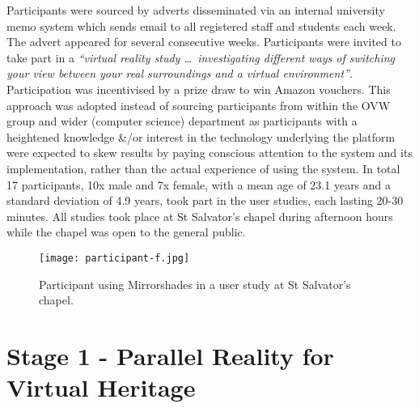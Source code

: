 Participants were sourced by adverts disseminated via an internal university memo system which sends email to all registered staff and students each week. The advert appeared for several consecutive weeks. Participants were invited to take part in a \textit{``virtual reality study \ldots\ investigating different ways of switching your view between your real surroundings and a virtual environment''}. Participation was incentivised by a prize draw to win Amazon vouchers. This approach was adopted instead of sourcing participants from within the OVW group and wider (computer science) department as participants with a heightened knowledge \&/or interest in the technology underlying the platform were expected to skew results by paying conscious attention to the system and its implementation, rather than the actual experience of using the system. In total 17 participants, 10x male and 7x female, with a mean age of 23.1 years and a standard deviation of 4.9 years, took part in the user studies, each lasting 20-30 minutes. All studies took place at St Salvator's chapel during afternoon hours while the chapel was open to the general public.

\begin{figure}
	\begin{center}
		\texttt{[image: participant-f.jpg]}
		\caption{Participant using Mirrorshades in a user study at St Salvator's chapel.}
		\label{participant-f.jpg}
	\end{center}
\end{figure}


\section{Stage 1 - Parallel Reality for Virtual Heritage}

